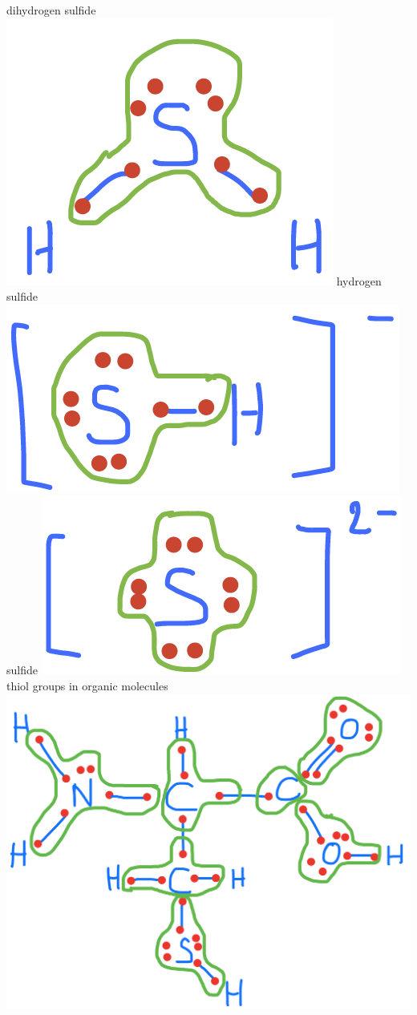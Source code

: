 \documentclass[]{book}
\theoremstyle{definition}
\theoremstyle{definition}
\theoremstyle{definition}
\theoremstyle{remark}
\begin{document}
dihydrogen sulfide~\includegraphics{pictures/ElecAlloc_H2S.png} hydrogen
sulfide \includegraphics{pictures/ElecAlloc_HS-.png} sulfide
\includegraphics{pictures/ElecAlloc_S2-.png} thiol groups in organic
molecules \includegraphics{pictures/ElecAlloc_cysteine.png}
\end{document}
